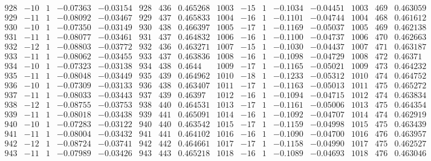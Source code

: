 \documentclass[11pt,reqno,a4letter]{article}
\numberwithin{figure}{section}
\numberwithin{table}{section}
\theoremstyle{plain}
\numberwithin{theorem}{section}
\theoremstyle{definition}
\begin{document}
\begin{table}[ht]
\begin{equation*}
{\begin{array}{ccccc|ccc|ccccc|ccc}
 928 & -10 & 1 & -0.07363 & -0.03154 & 928 & 436 & 0.465268 & 1003 & -15 & 1 & -0.1034 & -0.04451 & 1003 & 469 & 0.463059 \\
 929 & -11 & 1 & -0.08092 & -0.03467 & 929 & 437 & 0.465833 & 1004 & -16 & 1 & -0.1101 & -0.04744 & 1004 & 468 & 0.461612 \\
 930 & -10 & 1 & -0.07350 & -0.03149 & 930 & 438 & 0.466397 & 1005 & -17 & 1 & -0.1169 & -0.05037 & 1005 & 469 & 0.462138 \\
 931 & -11 & 1 & -0.08077 & -0.03461 & 931 & 437 & 0.464832 & 1006 & -16 & 1 & -0.1100 & -0.04737 & 1006 & 470 & 0.462663 \\
 932 & -12 & 1 & -0.08803 & -0.03772 & 932 & 436 & 0.463271 & 1007 & -15 & 1 & -0.1030 & -0.04437 & 1007 & 471 & 0.463187 \\
 933 & -11 & 1 & -0.08062 & -0.03455 & 933 & 437 & 0.463836 & 1008 & -16 & 1 & -0.1098 & -0.04729 & 1008 & 472 & 0.46371 \\
 934 & -10 & 1 & -0.07323 & -0.03138 & 934 & 438 & 0.4644 & 1009 & -17 & 1 & -0.1165 & -0.05021 & 1009 & 473 & 0.464232 \\
 935 & -11 & 1 & -0.08048 & -0.03449 & 935 & 439 & 0.464962 & 1010 & -18 & 1 & -0.1233 & -0.05312 & 1010 & 474 & 0.464752 \\
 936 & -10 & 1 & -0.07309 & -0.03133 & 936 & 438 & 0.463407 & 1011 & -17 & 1 & -0.1163 & -0.05013 & 1011 & 475 & 0.465272 \\
 937 & -11 & 1 & -0.08033 & -0.03443 & 937 & 439 & 0.46397 & 1012 & -16 & 1 & -0.1094 & -0.04715 & 1012 & 474 & 0.463834 \\
 938 & -12 & 1 & -0.08755 & -0.03753 & 938 & 440 & 0.464531 & 1013 & -17 & 1 & -0.1161 & -0.05006 & 1013 & 475 & 0.464354 \\
 939 & -11 & 1 & -0.08018 & -0.03438 & 939 & 441 & 0.465091 & 1014 & -16 & 1 & -0.1092 & -0.04707 & 1014 & 474 & 0.462919 \\
 940 & -10 & 1 & -0.07283 & -0.03122 & 940 & 440 & 0.463542 & 1015 & -17 & 1 & -0.1159 & -0.04998 & 1015 & 475 & 0.463439 \\
 941 & -11 & 1 & -0.08004 & -0.03432 & 941 & 441 & 0.464102 & 1016 & -16 & 1 & -0.1090 & -0.04700 & 1016 & 476 & 0.463957 \\
 942 & -12 & 1 & -0.08724 & -0.03741 & 942 & 442 & 0.464661 & 1017 & -17 & 1 & -0.1158 & -0.04990 & 1017 & 475 & 0.462527 \\
 943 & -11 & 1 & -0.07989 & -0.03426 & 943 & 443 & 0.465218 & 1018 & -16 & 1 & -0.1089 & -0.04693 & 1018 & 476 & 0.463046 \\

\end{array}}
\end{equation*}
\end{table}
\end{document}
